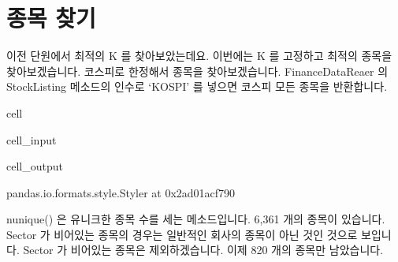 \documentclass[letterpaper,10pt,english]{jupyterBook}
\begin{document}
\part{종목 찾기}
\label{\detokenize{chapter2/2.4.1_Volatility_Breakout:id3}}
\sphinxAtStartPar
이전 단원에서 최적의 K 를 찾아보았는데요. 이번에는 K 를 고정하고 최적의 종목을 찾아보겠습니다. 코스피로 한정해서 종목을 찾아보겠습니다. FinanceDataReaer 의 StockListing 메소드의 인수로 ‘KOSPI’ 를 넣으면 코스피 모든 종목을 반환합니다.

\begin{sphinxuseclass}{cell}\begin{sphinxVerbatimInput}

\begin{sphinxuseclass}{cell_input}
\begin{sphinxVerbatim}[commandchars=\\\{\}]
    
   
   

  
\end{sphinxVerbatim}

\end{sphinxuseclass}\end{sphinxVerbatimInput}
\begin{sphinxVerbatimOutput}

\begin{sphinxuseclass}{cell_output}
\begin{sphinxVerbatim}[commandchars=\\\{\}]
\PYGZlt{}pandas.io.formats.style.Styler at 0x2ad01acf790\PYGZgt{}
\end{sphinxVerbatim}

\end{sphinxuseclass}\end{sphinxVerbatimOutput}

\end{sphinxuseclass}
\sphinxAtStartPar
 nunique() 은 유니크한 종목 수를 세는 메소드입니다. 6,361 개의 종목이 있습니다. Sector 가 비어있는 종목의 경우는 일반적인 회사의 종목이 아닌 것인 것으로 보입니다. Sector 가 비어있는 종목은 제외하겠습니다. 이제 820 개의 종목만 남았습니다.
\end{document}
